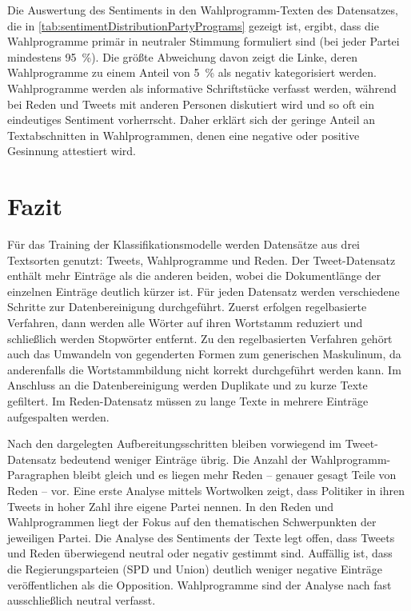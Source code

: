 Die Auswertung des Sentiments in den Wahlprogramm-Texten des Datensatzes, die in \autoref{tab:sentimentDistributionPartyPrograms} gezeigt ist, ergibt, dass die Wahlprogramme primär in neutraler Stimmung formuliert sind (bei jeder Partei mindestens \SI{95}{\percent}). Die größte Abweichung davon zeigt die Linke, deren Wahlprogramme zu einem Anteil von \SI{5}{\percent} als negativ kategorisiert werden. Wahlprogramme werden als informative Schriftstücke verfasst werden, während bei Reden und Tweets mit anderen Personen diskutiert wird und so oft ein eindeutiges Sentiment vorherrscht. Daher erklärt sich der geringe Anteil an Textabschnitten in Wahlprogrammen, denen eine negative oder positive Gesinnung attestiert wird.

\section{Fazit} \label{sec:crispConclusion_1}

Für das Training der Klassifikationsmodelle werden Datensätze aus drei Textsorten genutzt: Tweets, Wahlprogramme und Reden. Der Tweet-Datensatz enthält mehr Einträge als die anderen beiden, wobei die Dokumentlänge der einzelnen Einträge deutlich kürzer ist. Für jeden Datensatz werden verschiedene Schritte zur Datenbereinigung durchgeführt. Zuerst erfolgen regelbasierte Verfahren, dann werden alle Wörter auf ihren Wortstamm reduziert und schließlich werden Stopwörter entfernt. Zu den regelbasierten Verfahren gehört auch das Umwandeln von gegenderten Formen zum generischen Maskulinum, da anderenfalls die Wortstammbildung nicht korrekt durchgeführt werden kann. Im Anschluss an die Datenbereinigung werden Duplikate und zu kurze Texte gefiltert. Im Reden-Datensatz müssen zu lange Texte in mehrere Einträge aufgespalten werden.

Nach den dargelegten Aufbereitungsschritten bleiben vorwiegend im Tweet-Datensatz bedeutend weniger Einträge übrig. Die Anzahl der Wahlprogramm-Paragraphen bleibt gleich und es liegen mehr Reden -- genauer gesagt Teile von Reden -- vor. Eine erste Analyse mittels Wortwolken zeigt, dass Politiker in ihren Tweets in hoher Zahl ihre eigene Partei nennen. In den Reden und Wahlprogrammen liegt der Fokus auf den thematischen Schwerpunkten der jeweiligen Partei. Die Analyse des Sentiments der Texte legt offen, dass Tweets und Reden überwiegend neutral oder negativ gestimmt sind. Auffällig ist, dass die Regierungsparteien (\ac{SPD} und Union) deutlich weniger negative Einträge veröffentlichen als die Opposition. Wahlprogramme sind der Analyse nach fast ausschließlich neutral verfasst.
